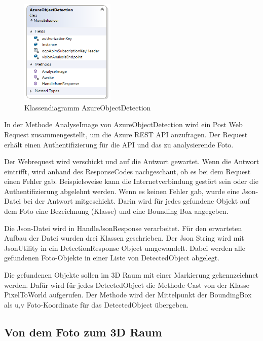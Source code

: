 \documentclass[german,a4paper, 12pt]{llncs}
\begin{document}
\begin{figure}[H]
	\centering
	\includegraphics[width=0.4\textwidth]{images/dia_azureobjectdetection.PNG}
	\caption[]{Klassendiagramm AzureObjectDetection}
	\label{dia:azureobjectdetection}
\end{figure}

In der Methode AnalyseImage von AzureObjectDetection wird ein Post Web Request zusammengestellt, um die Azure REST API anzufragen. Der Request erhält einen Authentifizierung für die API und das zu analysierende Foto.

Der Webrequest wird verschickt und auf die Antwort gewartet. Wenn die Antwort eintrifft, wird anhand des ResponseCodes nachgeschaut, ob es bei dem Request einen Fehler gab. Beispielsweise kann die Internetverbindung gestört sein oder die Authentifizierung abgelehnt werden.
Wenn es keinen Fehler gab, wurde eine Json-Datei bei der Antwort mitgeschickt. Darin wird für jedes gefundene Objekt auf dem Foto eine Bezeichnung (Klasse) und eine Bounding Box angegeben. 

Die Json-Datei wird in HandleJsonResponse verarbeitet. Für den erwarteten Aufbau der Datei wurden drei Klassen geschrieben. Der Json String wird mit JsonUtility in ein DetectionResponse Object umgewandelt. Dabei werden alle gefundenen Foto-Objekte in einer Liste von DetectedObject abgelegt.\cite{fromjson}

Die gefundenen Objekte sollen im 3D Raum mit einer Markierung gekennzeichnet werden. 
Dafür wird für jedes DetectedObject die Methode Cast von der Klasse PixelToWorld aufgerufen. Der Methode wird der Mittelpunkt der BoundingBox als u,v Foto-Koordinate für das DetectedObject übergeben.

\subsection{Von dem Foto zum 3D Raum}
\end{document}
